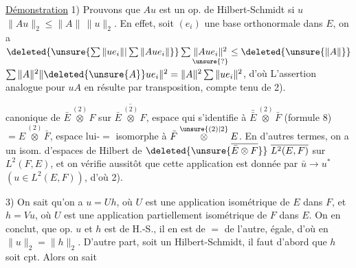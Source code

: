 \uline{Démonstration}  1) Prouvons  que $Au$ est
un op. de Hilbert-Schmidt si $u$  
$\|Au\|_2\leq\|A\|\,\|u\|_2$. En effet, soit $(e_i)$ une base orthonormale
dans $E$, on a $\deleted{\unsure{\sum\|ue_i\||\sum\|Aue_i\|}}\sum\underset{\unsure{?}}{\|Aue_i\|^2}\leq\deleted{\unsure{\|A\|}}$
$\sum\|A\|^2\|\deleted{\unsure{A}}ue_i\|^2=\|A\|^2\sum\|ue_i\|^2$, d'où  
L'assertion analogue pour $uA$ en résulte par transposition,
compte tenu de 2).

 
canonique de $\bar E\overset{(2)}{\otimes}F$ sur $\overline{\bar E\overset{(2)}{\otimes}F}$, espace
qui  s'identifie à $\bar{\bar E}\overset{(2)}{\otimes}\bar F$ (formule 8)
$=E\overset{(2)}{\otimes}\bar F$,  espace lui-$=$  isomorphe
à $\bar F\overset{\unsure{(2)|2}}{\otimes}E$.  En d'autres termes, on a
un  isom. d'espaces de Hilbert de
$\deleted{\unsure{\overline{\bar E\otimes F}}}\ \overline{L^2(E,F)}$ sur $L^2(F,E)$, et on vérifie
aussitôt que  cette application est donnée
par $\bar u\to u^*$ $(u\in L^2(E,F))$, d'où 2).

3) On sait qu'on a $u=Uh$, où $U$ est
une application  isométrique de $E$ dans $F$,
et $h=Vu$, où $U$ est une application partiellement
isométrique de $F$ dans $E$. On en conclut,  
  que   op.  $u$
et $h$ est de H.-S., il en est de $=$ de
l'autre,  
égale, d'où en   $\|u\|_2=\|h\|_2$.  D'autre
  
part,  soit un Hilbert-Schmidt, il
faut d'abord que $h$ soit cpt. Alors on sait

